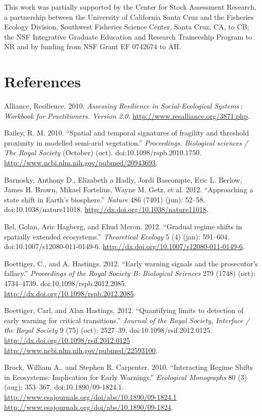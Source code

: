 \documentclass[author-year, review]{elsarticle} %
\begin{document}
This work was partially supported by the Center for Stock Assessment
Research, a partnership between the University of California Santa Cruz
and the Fisheries Ecology Division, Southwest Fisheries Science Center,
Santa Cruz, CA, to CB; the NSF Integrative Graduate Education and
Research Traineeship Program to NR and by funding from NSF Grant EF
0742674 to AH.

\section{References}

Alliance, Resilience. 2010. \emph{Assessing Resilience in
Social-Ecological Systems : Workbook for Practitioners. Version 2.0}.
\url{http://www.resalliance.org/3871.php}.

Bailey, R. M. 2010. ``Spatial and temporal signatures of fragility and
threshold proximity in modelled semi-arid vegetation.''
\emph{Proceedings. Biological sciences / The Royal Society} (October)
(oct). doi:10.1098/rspb.2010.1750.
\url{http://www.ncbi.nlm.nih.gov/pubmed/20943693}.

Barnosky, Anthony D., Elizabeth a Hadly, Jordi Bascompte, Eric L.
Berlow, James H. Brown, Mikael Fortelius, Wayne M. Getz, et al. 2012.
``Approaching a state shift in Earth's biosphere.'' \emph{Nature} 486
(7401) (jun): 52--58. doi:10.1038/nature11018.
\url{http://dx.doi.org/10.1038/nature11018}.

Bel, Golan, Aric Hagberg, and Ehud Meron. 2012. ``Gradual regime shifts
in spatially extended ecosystems.'' \emph{Theoretical Ecology} 5 (4)
(jan): 591--604. doi:10.1007/s12080-011-0149-6.
\url{http://dx.doi.org/10.1007/s12080-011-0149-6}.

Boettiger, C., and A. Hastings. 2012. ``Early warning signals and the
prosecutor's fallacy.'' \emph{Proceedings of the Royal Society B:
Biological Sciences} 279 (1748) (oct): 4734--4739.
doi:10.1098/rspb.2012.2085.
\url{http://dx.doi.org/10.1098/rspb.2012.2085}.

Boettiger, Carl, and Alan Hastings. 2012. ``Quantifying limits to
detection of early warning for critical transitions.'' \emph{Journal of
the Royal Society, Interface / the Royal Society} 9 (75) (oct):
2527--39. doi:10.1098/rsif.2012.0125.
\href{http://dx.doi.org/10.1098/rsif.2012.0125 http://www.ncbi.nlm.nih.gov/pubmed/22593100}{http://dx.doi.org/10.1098/rsif.2012.0125
http://www.ncbi.nlm.nih.gov/pubmed/22593100}.

Brock, William A., and Stephen R. Carpenter. 2010. ``Interacting Regime
Shifts in Ecosystems: Implication for Early Warnings.'' \emph{Ecological
Monographs} 80 (3) (aug): 353--367. doi:10.1890/09-1824.1.
\href{http://www.esajournals.org/doi/abs/10.1890/09-1824.1 http://www.esajournals.org/doi/abs/10.1890/09-1824}{http://www.esajournals.org/doi/abs/10.1890/09-1824.1
http://www.esajournals.org/doi/abs/10.1890/09-1824}.
\end{document}

